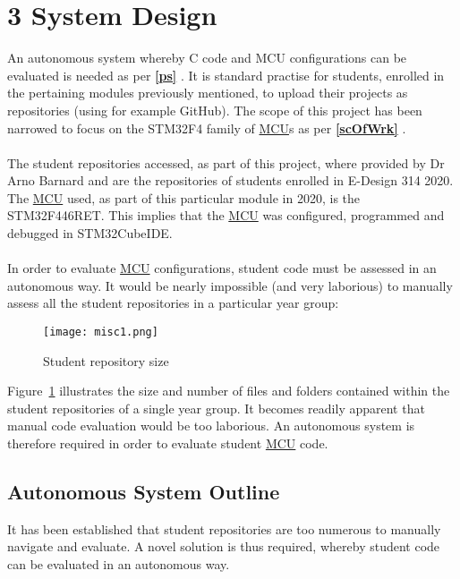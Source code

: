 

\chapter*{3 System Design}
\label{3}
\setcounter{chapter}{3}
\setcounter{section}{0}
\setcounter{figure}{0}
\setcounter{table}{0}
An autonomous system whereby C code and MCU configurations can be evaluated is needed as per \textbf{\ref{ps} }. It is standard practise for students, enrolled in the pertaining modules previously mentioned, to upload their projects as repositories (using for example GitHub). The scope of this project has been narrowed to focus on the STM32F4 family of \hyperref[listAbr]{MCU}s as per \textbf{\ref{scOfWrk} }. 
\\\\
The student repositories accessed, as part of this project, where provided by Dr Arno Barnard and are the repositories of students enrolled in E-Design 314 2020. The \hyperref[listAbr]{MCU} used, as part of this particular module in 2020, is the STM32F446RET. This implies that the \hyperref[listAbr]{MCU} was configured, programmed and debugged in STM32CubeIDE.
\\\\
In order to evaluate \hyperref[listAbr]{MCU} configurations, student code must be assessed in an autonomous way. It would be nearly impossible (and very laborious) to manually assess all the student repositories in a particular year group:

\begin{figure}[H]
\begin{center}
\texttt{[image: misc1.png]}
\caption{Student repository size}
\label{stdSize}
\end{center}
\end{figure}

Figure~\ref{stdSize} illustrates the size and number of files and folders contained within the student repositories of a single year group. It becomes readily apparent that manual code evaluation would be too laborious. An autonomous system is therefore required in order to evaluate student \hyperref[listAbr]{MCU} code.


\section{Autonomous System Outline}
\label{aso}
It has been established that student repositories are too numerous to manually navigate and evaluate. A novel solution is thus required, whereby student code can be evaluated in an autonomous way. 

